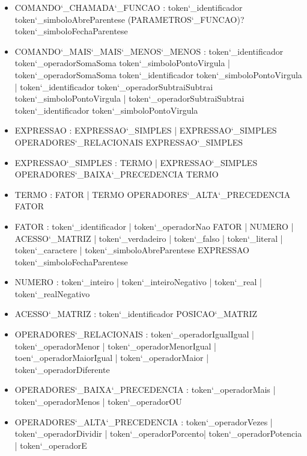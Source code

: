 \documentclass[
12pt,				%
a4paper,			%
english,			%
french,				%
spanish,			%
brazil,				%
article
]{abntex2}
\begin{document}
\begin{itemize}
	\item COMANDO\char`_CHAMADA\char`_FUNCAO : token\char`_identificador token\char`_simboloAbreParentese (PARAMETROS\char`_FUNCAO)? token\char`_simboloFechaParentese
	\item COMANDO\char`_MAIS\char`_MAIS\char`_MENOS\char`_MENOS : token\char`_identificador token\char`_operadorSomaSoma token\char`_simboloPontoVirgula |  token\char`_operadorSomaSoma token\char`_identificador token\char`_simboloPontoVirgula | token\char`_identificador token\char`_operadorSubtraiSubtrai token\char`_simboloPontoVirgula | token\char`_operadorSubtraiSubtrai token\char`_identificador token\char`_simboloPontoVirgula
	\item EXPRESSAO : EXPRESSAO\char`_SIMPLES | EXPRESSAO\char`_SIMPLES OPERADORES\char`_RELACIONAIS EXPRESSAO\char`_SIMPLES
	\item EXPRESSAO\char`_SIMPLES : TERMO | EXPRESSAO\char`_SIMPLES OPERADORES\char`_BAIXA\char`_PRECEDENCIA TERMO
	\item TERMO : FATOR | TERMO OPERADORES\char`_ALTA\char`_PRECEDENCIA FATOR
	\item FATOR : token\char`_identificador | token\char`_operadorNao FATOR | NUMERO | ACESSO\char`_MATRIZ | token\char`_verdadeiro | token\char`_falso | token\char`_literal | token\char`_caractere | token\char`_simboloAbreParentese EXPRESSAO token\char`_simboloFechaParentese
	\item NUMERO : token\char`_inteiro | token\char`_inteiroNegativo | token\char`_real | token\char`_realNegativo
	\item ACESSO\char`_MATRIZ : token\char`_identificador POSICAO\char`_MATRIZ
	\item OPERADORES\char`_RELACIONAIS : token\char`_operadorIgualIgual | token\char`_operadorMenor | token\char`_operadorMenorIgual | toen\char`_operadorMaiorIgual | token\char`_operadorMaior | token\char`_operadorDiferente
	\item OPERADORES\char`_BAIXA\char`_PRECEDENCIA : token\char`_operadorMais | token\char`_operadorMenos | token\char`_operadorOU
	\item OPERADORES\char`_ALTA\char`_PRECEDENCIA : token\char`_operadorVezes | token\char`_operadorDividir | token\char`_operadorPorcento| token\char`_operadorPotencia | token\char`_operadorE
\end{itemize}
\end{document}
